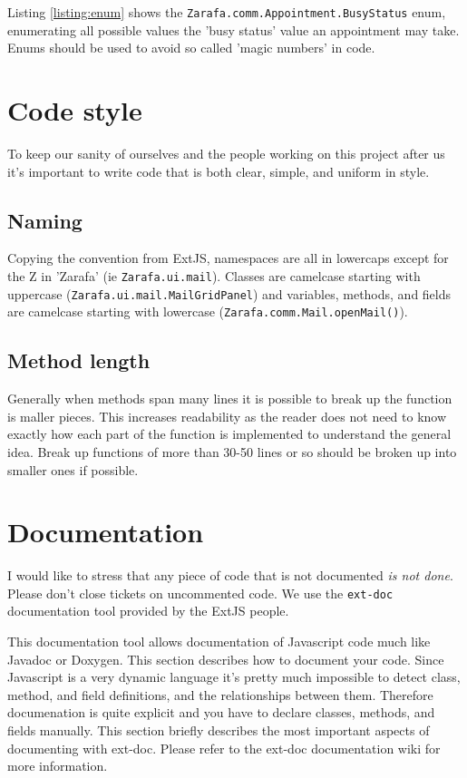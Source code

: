 Listing \ref{listing:enum} shows the {\tt Zarafa.comm.Appointment.BusyStatus} enum, enumerating all possible
values the 'busy status' value an appointment may take.  Enums should be used to avoid so called 'magic numbers'
in code. 

\section{Code style}

To keep our sanity of ourselves and the people working on this project after us it's important to write code
that is both clear, simple, and uniform in style. 

\subsection{Naming}

Copying the convention from ExtJS, namespaces are all in lowercaps except for the Z in 'Zarafa' 
(ie {\tt Zarafa.ui.mail}). Classes are camelcase starting with uppercase ({\tt Zarafa.ui.mail.MailGridPanel})
and variables, methods, and fields are camelcase starting with lowercase ({\tt Zarafa.comm.Mail.openMail()}).

\subsection{Method length}

Generally when methods span many lines it is possible to break up the function is maller pieces. This increases
readability as the reader does not need to know exactly how each part of the function is implemented to understand
the general idea. Break up functions of more than 30-50 lines or so should be broken up into smaller ones if 
possible. 

\section{Documentation}
	
I would like to stress that any piece of code that is not documented \emph{is not done}. Please don't close
tickets on uncommented code. We use the {\tt ext-doc} documentation tool provided by the ExtJS people.

This documentation tool allows documentation of Javascript code much like Javadoc or Doxygen. This section
describes how to document your code.
Since Javascript is a very dynamic language it's pretty much impossible to detect class, method, and field
definitions, and the relationships between them. Therefore documenation is quite explicit and you have to
declare classes, methods, and fields manually. This section briefly describes the most important aspects
of documenting with ext-doc. Please refer to the ext-doc documentation wiki for more information.


